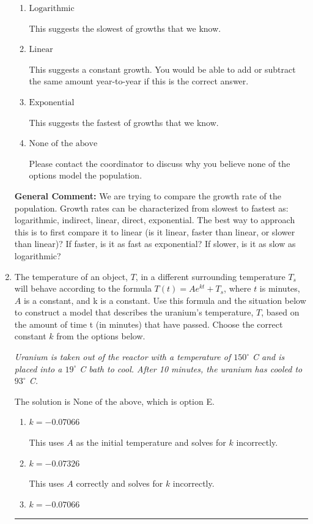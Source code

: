 \documentclass{extbook}[14pt]
\newcommand{\litem}[1]{\item #1

\rule{\textwidth}{0.4pt}}
\begin{document}
\begin{enumerate}
{\begin{enumerate}[label=\Alph*.]
This suggests a growth faster than constant but slower than exponential.
\item \( \text{Logarithmic} \)

This suggests the slowest of growths that we know.
\item \( \text{Linear} \)

This suggests a constant growth. You would be able to add or subtract the same amount year-to-year if this is the correct answer.
\item \( \text{Exponential} \)

This suggests the fastest of growths that we know.
\item \( \text{None of the above} \)

Please contact the coordinator to discuss why you believe none of the options model the population.
\end{enumerate}

\textbf{General Comment:} We are trying to compare the growth rate of the population. Growth rates can be characterized from slowest to fastest as: logarithmic, indirect, linear, direct, exponential. The best way to approach this is to first compare it to linear (is it linear, faster than linear, or slower than linear)? If faster, is it as fast as exponential? If slower, is it as slow as logarithmic?
}
\litem{
The temperature of an object, $T$, in a different surrounding temperature $T_s$ will behave according to the formula $T(t) = Ae^{kt} + T_s$, where $t$ is minutes, $A$ is a constant, and k is a constant. Use this formula and the situation below to construct a model that describes the uranium's temperature, $T$, based on the amount of time t (in minutes) that have passed. Choose the correct constant $k$ from the options below.

\begin{center}
    \textit{ Uranium is taken out of the reactor with a temperature of $150^{\circ}$ C and is placed into a $19^{\circ}$ C bath to cool. After 10 minutes, the uranium has cooled to $93^{\circ}$ C. }
\end{center}
The solution is \( \text{None of the above} \), which is option E.\begin{enumerate}[label=\Alph*.]
\item \( k = -0.07066 \)

This uses $A$ as the initial temperature and solves for $k$ incorrectly.
\item \( k = -0.07326 \)

This uses $A$ correctly and solves for $k$ incorrectly.
\item \( k = -0.07066 \)


\end{enumerate}}
\end{enumerate}
\end{document}
